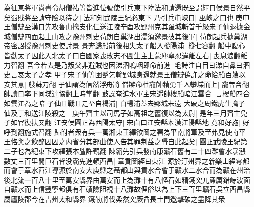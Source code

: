 為征東將軍尚書令胡僧祐等皆進位號使引兵東下陸法和請還既至謂繹曰侯景自然平矣蜀賊將至請守險以待之|{
	法和知武陵王紀必東下}
乃引兵屯峽口|{
	巫峽之口也}
庚申王僧辯至漢口先攻魯山擒支化仁送江陵辛酉攻郢州克其羅城斬首千級宋子仙退據金城僧辯四面起土山攻之豫州刺史荀朗自巢湖出濡須邀景破其後軍|{
	荀朗起兵據巢湖帝密詔授豫州刺史使討景}
景奔歸船前後相失太子船入樅陽浦|{
	樅七容翻}
船中腹心皆勸太子因此入北太子曰自國家喪敗志不圖生主上蒙塵寧忍違離左右|{
	喪息浪翻離力智翻}
吾今若去是乃叛父非避賊也因涕泗嗚咽即命前進|{
	毛詩注自目曰涕自鼻曰泗史言哀太子之孝}
甲子宋子仙等困蹙乞輸郢城身還就景王僧辯偽許之命給船百艘以安其意|{
	艘蘇刀翻}
子仙謂為信然浮舟將僧辯命杜龕帥精勇千人攀堞而上|{
	龕苦含翻帥讀曰率下同堞達協翻上時掌翻}
鼔譟奄進水軍主宋遥帥樓船暗江雲合|{
	言樓船四合如雲江為之暗}
子仙且戰且走至自楊浦|{
	白楊浦蓋去郢城未遠}
大破之周鐵虎生擒子仙及丁和送江陵殺之　庚午齊主以司馬子如高祖之舊復以為太尉|{
	是年三月齊主免子如官復扶又翻}
江安侯圓正為西陽太守|{
	宋白曰江安縣本漢江陽縣地}
寛和好施|{
	好呼到翻施式智翻}
歸附者衆有兵一萬湘東王繹欲圖之署為平南將軍及至弗見使南平王恪與之飲醉因囚之内省分其部曲使人告其罪荆益之舋自此起矣|{
	圓正武陵王紀第二子也為紀東下攻繹張本舋許覲翻}
陳霸先引兵發南康灨石舊有二十四灘會水暴漲數丈三百里間巨石皆没霸先進頓西昌|{
	章貢圖經曰東江源於汀州界之新樂山經雩都而會于章水西江導源於南安大庾縣之聶都山與貢水合會于贛水二水合而為贛在州治後北流一百八十里至萬安縣界由萬安而上為灘十有八怪石如精鐵突兀亷厲錯峙波面自贛水而上信豐寧都俱有石磧險阻視十八灘故俚俗以為上下三百里贛石吳立西昌縣屬廬陵郡今在吉州太和縣界}
鐵勒將伐柔然突厥酋長土門邀擊破之盡降其衆

